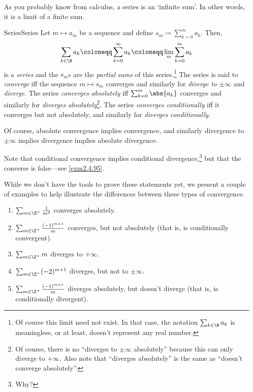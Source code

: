 As you probably know from calculus, a series is an `infinite sum'.  In other words, it is a limit of a finite sum.
\begin{dfn}{Series}{Series}
Let $m\mapsto a_m$ be a sequence and define $s_m\coloneqq \sum _{k=0}^ma_k$.  Then,
\begin{equation}
\sum _{k\in \N}a_k\coloneqq \sum _{k=0}^\infty a_k\coloneqq \lim _m\sum _{k=0}^ma_k
\end{equation}
is a \emph{series} and the $s_m$s are the \emph{partial sums} of this series.\footnote{Of course this limit need not exist.  In that case, the notation $\sum _{k\in \N}a_k$ is meaningless, or at least, doesn't represent any real number.}  The series is said to \emph{converge} iff the sequence $m\mapsto s_m$ converges and similarly for \emph{diverge to $\pm \infty$} and \emph{diverge}.  The series \emph{converges absolutely} iff $\sum _{k=0}^m\abs{a_k}$ converges and similarly for \emph{diverges absolutely}\footnote{Of course, there is no ``diverges to $\pm \infty$ absolutely'' because this can only diverge to $+\infty$.  Also note that ``diverges absolutely'' is the same as ``doesn't converge absolutely''.}.  The series \emph{converges conditionally} iff it converges but not absolutely, and similarly for \emph{diverges conditionally}.
\begin{rmk}
Of course, absolute convergence implies convergence, and similarly divergence to $\pm \infty$ implies divergence implies absolute divergence.
\end{rmk}
\begin{rmk}
Note that conditional convergence implies conditional divergence,\footnote{Why?} but that the converse is false---see \cref{exm2.4.95}.
\end{rmk}
\end{dfn}
\begin{exm}{}{}
While we don't have the tools to prove these statements yet, we present a couple of examples to help illustrate the differences between these types of convergence.

\begin{enumerate}
\item $\sum _{m\in \Z ^+}\frac{1}{m^2}$ converges absolutely.
\item $\sum _{m\in \Z ^+}\frac{(-1)^{m+1}}{m}$ converges, but not absolutely (that is, is conditionally convergent).
\item $\sum _{m\in \Z ^+}m$ diverges to $+\infty$.
\item $\sum _{m\in \Z ^+}(-2)^{m+1}$ diverges, but not to $\pm \infty$.
\item $\sum _{m\in \Z ^+}\frac{(-1)^{m+1}}{m}$ diverges absolutely, but doesn't diverge (that is, is conditionally divergent).
\end{enumerate}
\end{exm}
